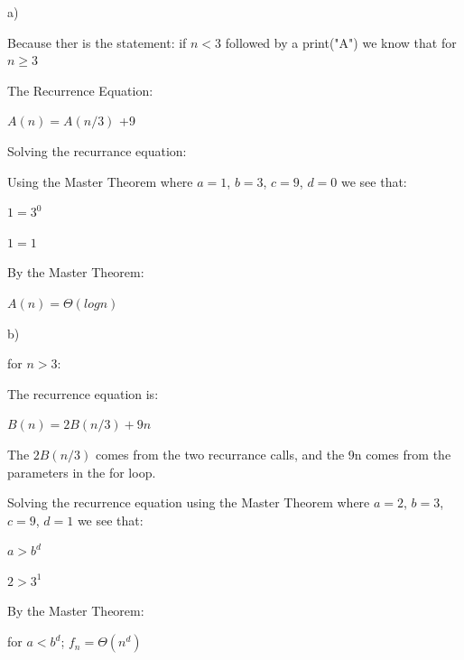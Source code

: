 \documentclass{article}
\begin{document}
\vfill
\eject
\begin{solution}
\newline

a)
\newline
  
Because ther is the statement: if $n < 3$ followed by a print("A") we know that for $n \ge 3$
\newline

The Recurrence Equation:
\newline

$A(n) = A(n/3)$ +9
\newline

Solving the recurrance equation:
\newline

Using the Master Theorem where $a=1$, $b=3$, $c=9$, $d=0$ we see that:
\newline

$1 = 3^0$
\newline

$1=1$
\newline

By the Master Theorem:
\newline

$A(n) = \Theta(logn)$
\newline

b)
\newline

for $n > 3$:
\newline

The recurrence equation is:
\newline

$B(n) = 2B(n/3) +9n$
\newline

The $2B(n/3)$ comes from the two recurrance calls, and the 9n comes from the parameters in the for loop.
\newline

Solving the recurrence equation using the Master Theorem where $a=2$, $b=3$, $c=9$, $d=1$  we see that:
\newline

$a>b^d$
\newline

$2>3^1$
\newline

By the Master Theorem:
\newline

for $a<b^d$; $f_n = \Theta(n^d)$
\newline


\end{solution}
\end{document}
